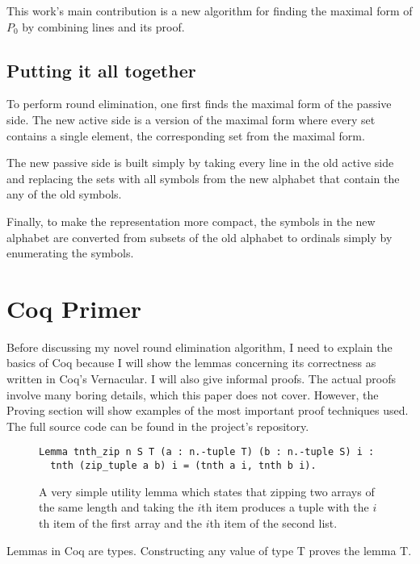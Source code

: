 \documentclass[english, 12pt, a4paper, sci, a-1b, online]{aaltothesis}
\begin{document}
This work's main contribution is a new algorithm for finding the maximal form of $P_{0}$ by combining lines and its proof.


\subsection{Putting it all together}

To perform round elimination, one first finds the maximal form of the passive side. The new active side is a version of the maximal form where every set contains a single element, the corresponding set from the maximal form.

The new passive side is built simply by taking every line in the old active side and replacing the sets with all symbols from the new alphabet that contain the any of the old symbols.

Finally, to make the representation more compact, the symbols in the new alphabet are converted from subsets of the old alphabet to ordinals simply by enumerating the symbols.

\section{Coq Primer}

Before discussing my novel round elimination algorithm, I need to explain the basics of Coq because I will show the lemmas concerning its correctness as written in Coq's Vernacular. I will also give informal proofs. The actual proofs involve many boring details, which this paper does not cover. However, the Proving section will show examples of the most important proof techniques used. The full source code can be found in the project's repository\cite{source_code}.

\begin{figure}[h]
\begin{verbatim}
Lemma tnth_zip n S T (a : n.-tuple T) (b : n.-tuple S) i :
  tnth (zip_tuple a b) i = (tnth a i, tnth b i).
\end{verbatim}
\caption{A very simple utility lemma which states that zipping two arrays of the same length and taking the $i$th item produces a tuple with the $i$th item of the first array and the $i$th item of the second list.}
\end{figure}

Lemmas in Coq are types. Constructing any value of type T proves the lemma T.
\end{document}
